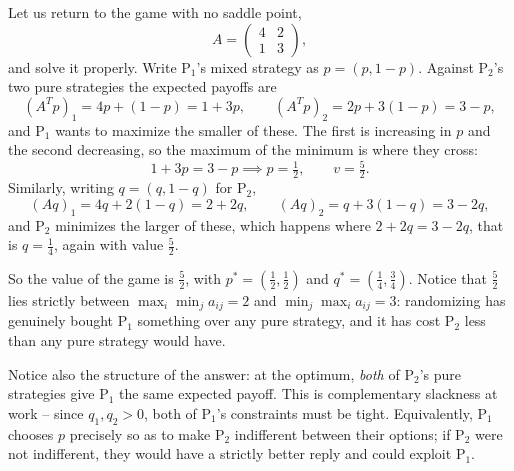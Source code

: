 \documentclass[a4paper]{scrartcl}
\begin{document}
\begin{example}
    Let us return to the game with no saddle point,
    $$
    A = \begin{pmatrix} 4 & 2\\1&3\end{pmatrix},
    $$
    and solve it properly. Write $\mathrm{P}_1$'s mixed strategy as $p = (p, 1-p)$. Against $\mathrm{P}_2$'s two pure strategies the expected payoffs are
    $$
    (A^Tp)_1 = 4p + (1-p) = 1 + 3p, \qquad (A^Tp)_2 = 2p + 3(1-p) = 3 - p,
    $$
    and $\mathrm{P}_1$ wants to maximize the smaller of these. The first is increasing in $p$ and the second decreasing, so the maximum of the minimum is where they cross:
    $$
    1 + 3p = 3 - p \implies p = \tfrac12, \qquad v = \tfrac52.
    $$
    Similarly, writing $q = (q, 1-q)$ for $\mathrm{P}_2$,
    $$
    (Aq)_1 = 4q + 2(1-q) = 2 + 2q, \qquad (Aq)_2 = q + 3(1-q) = 3 - 2q,
    $$
    and $\mathrm{P}_2$ minimizes the larger of these, which happens where $2 + 2q = 3 - 2q$, that is $q = \frac14$, again with value $\frac52$.

    So the value of the game is $\frac52$, with $p^* = \left(\frac12,\frac12\right)$ and $q^* = \left(\frac14,\frac34\right)$. Notice that $\frac52$ lies strictly between $\max_i\min_j a_{ij} = 2$ and $\min_j\max_i a_{ij} = 3$: randomizing has genuinely bought $\mathrm{P}_1$ something over any pure strategy, and it has cost $\mathrm{P}_2$ less than any pure strategy would have.

    Notice also the structure of the answer: at the optimum, \emph{both} of $\mathrm{P}_2$'s pure strategies give $\mathrm{P}_1$ the same expected payoff. This is complementary slackness at work -- since $q_1, q_2 > 0$, both of $\mathrm{P}_1$'s constraints must be tight. Equivalently, $\mathrm{P}_1$ chooses $p$ precisely so as to make $\mathrm{P}_2$ indifferent between their options; if $\mathrm{P}_2$ were not indifferent, they would have a strictly better reply and could exploit $\mathrm{P}_1$.
\end{example}
\end{document}
